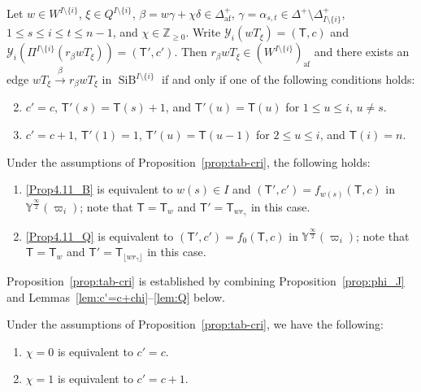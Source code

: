\documentclass[ALCO,ThmDefs,Unicode,epreuves]{cedram}
\newcommand{\BZ}{\mathbb{Z}}
\newcommand{\si}{\frac{\infty}{2}}
\DeclareMathOperator{\af}{af}
\DeclareMathOperator{\SiB}{SiB}
\begin{document}
\begin{prop} \label{prop:tab-cri}
Let 
$w \in W^{I \setminus \{ i \}}$, 
$\xi \in Q^{I \setminus \{ i \}}$, 
$\beta = w\gamma + \chi \delta \in \Delta_{\af}^+$, 
$\gamma = \alpha_{s,t} \in \Delta^+ \setminus \Delta_{I \setminus \{ i \}}^+$, 
$1 \leq s \leq i \leq t \leq n-1$, and
$\chi \in \BZ_{\geq 0}$. 
Write 
$\mathcal{Y}_i (wT_{\xi}) = (\mathsf{T},c)$
and 
$\mathcal{Y}_i \left( \Pi^{I \setminus \{ i \}}(r_{\beta}wT_{\xi}) \right) = (\mathsf{T}',c')$. 
Then 
$r_{\beta}wT_{\xi} \in (W^{I \setminus \{ i \}})_{\af}$
and 
there exists an edge 
$wT_{\xi} \xrightarrow{\ \beta \ } r_{\beta}wT_{\xi}$
in 
$\SiB ^{I \setminus \{ i \}}$
if and only if one of the following conditions holds:
\begin{enumerate}[label=(\Alph*)]\setcounter{enumi}{1}
\item\label{Prop4.11_B} %
$c' = c$, 
$\mathsf{T}'(s) = \mathsf{T}(s) + 1$, 
and 
$\mathsf{T}'(u) = \mathsf{T}(u)$ 
for $1 \leq u \leq i$, $u \neq s$.\setcounter{enumi}{16} 
\item\label{Prop4.11_Q} %
$c' = c + 1$, 
$\mathsf{T}'(1) = 1$, 
$\mathsf{T}'(u) = \mathsf{T}(u-1)$ for $2 \leq u \leq i$, 
and 
$\mathsf{T}(i) = n$.
\end{enumerate}
\end{prop}

\begin{rema}
Under the assumptions of Proposition~\ref{prop:tab-cri}, 
the following holds: 
\begin{enumerate}[label=(\arabic*)]
\item\label{Rema4.12_1}
\ref{Prop4.11_B} is equivalent to 
$w(s) \in I$ 
and 
$(\mathsf{T}', c') = f_{w(s)}(\mathsf{T} , c)$
in 
$\mathbb{Y}^{\si}(\varpi_i)$; 
note that 
$\mathsf{T} = \mathsf{T}_w$ 
and 
$\mathsf{T}' = \mathsf{T}_{w r_{\gamma}}$ 
in this case. 
\item\label{Rema4.12_2}
\ref{Prop4.11_Q} is equivalent to 
$(\mathsf{T}', c') = f_0(\mathsf{T} , c)$
in 
$\mathbb{Y}^{\si}(\varpi_i)$; 
note that 
$\mathsf{T} = \mathsf{T}_w$ 
and 
$\mathsf{T}' = \mathsf{T}_{\lfloor w r_{\gamma} \rfloor}$ 
in this case. 
\end{enumerate}
\end{rema}

Proposition~\ref{prop:tab-cri} is established by combining 
Proposition~\ref{prop:phi_J} and Lemmas~\ref{lem:c'=c+chi}--\ref{lem:Q} below.

\begin{lemm} \label{lem:c'=c+chi}
Under the assumptions of Proposition~\ref{prop:tab-cri}, 
we have the following:
\begin{enumerate}[label=(\arabic*)]
\item \label{Lemm_4.13_1}
$\chi = 0$
is equivalent to 
$c' = c$. 
\item\label{Lemm_4.13_2}
$\chi = 1$
is equivalent to 
$c' = c+1$. 
\end{enumerate}
\end{lemm}
\end{document}
